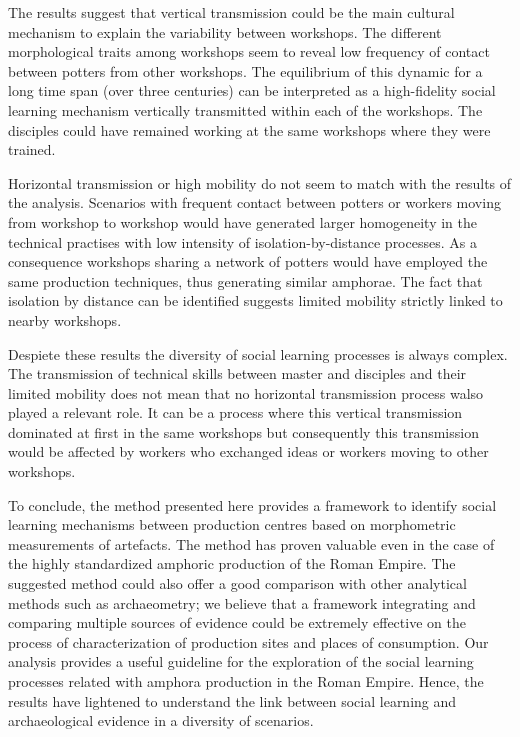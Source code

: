 \documentclass[review]{elsarticle}
\begin{document}

The results suggest that vertical transmission could be the main cultural mechanism to explain the variability between workshops. The different morphological traits among workshops seem to reveal low frequency of contact between potters from other workshops. The equilibrium of this dynamic for a long time span (over three centuries) can be interpreted as a high-fidelity social learning mechanism vertically transmitted within each of the workshops. The disciples could have remained working at the same workshops where they were trained. 

Horizontal transmission or high mobility do not seem to match with the results of the analysis. Scenarios with frequent contact between potters or workers moving from workshop to workshop would have generated larger homogeneity in the technical practises with low intensity of isolation-by-distance processes. As a consequence workshops sharing a network of potters would have employed the same production techniques, thus generating similar amphorae. The fact that isolation by distance can be identified suggests limited mobility strictly linked to nearby workshops.

Despiete these results the diversity of social learning processes is always complex. The transmission of technical skills between master and disciples and their limited mobility does not mean that no horizontal transmission process walso played a relevant role. It can be a process where this vertical transmission dominated at first in the same workshops but consequently this transmission would be affected by workers who exchanged ideas or workers moving to other workshops. 

To conclude, the method presented here provides a framework to identify social learning mechanisms between production centres based on morphometric measurements of artefacts. The method has proven valuable even in the case of the highly standardized amphoric production of the Roman Empire. The suggested method could also offer a good comparison with other analytical methods such as archaeometry; we believe that a framework integrating and comparing multiple sources of evidence could be extremely effective on the process of characterization of production sites and places of consumption. Our analysis provides a useful guideline for the exploration of the social learning processes related with amphora production in the Roman Empire. Hence, the results have lightened to understand the link between social learning and archaeological evidence in a diversity of scenarios. 
\end{document}

